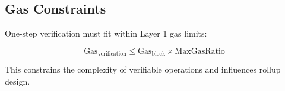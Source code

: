 \subsection{Gas Constraints}

One-step verification must fit within Layer 1 gas limits:

\begin{equation}
\text{Gas}_{\text{verification}} \leq \text{Gas}_{\text{block}} \times \text{MaxGasRatio}
\end{equation}

This constrains the complexity of verifiable operations and influences rollup design.

